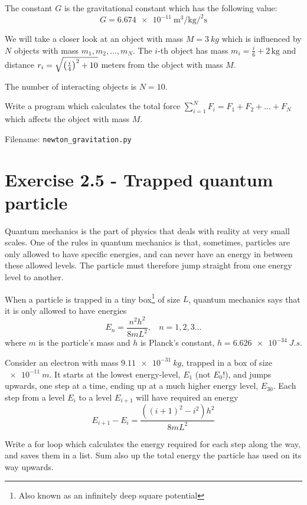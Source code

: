 \documentclass[10pt,a4paper]{article}
\newcommand{\planck}{$h = \SI{6.626e-34}{J.s}$}
\begin{document}
	The constant $G$ is the gravitational constant which has the following value:
	\[
	G = \SI{6.674e-11}{\cubic\meter\per\kilogram\per\squared\second}
	\]
	
	We will take a closer look at an object with mass $M = \SI{3}{kg}$ which is influenced by $N$ objects with mass  $m_1,m_2,\dots,m_N$. The $i$-th object has mass $m_i = \frac{i}{6}+2\,\mathrm{kg}$ and distance  $r_i = \sqrt{\qty(\frac{i}{4})^2 + 10}$ meters from the object with mass $M$. 
	
	The number of interacting objects is $N = 10$.
	
	Write a program which calculates the total force  $\sum_{i = 1}^N F_i = F_1 + F_2 + ... + F_N$ which affects the object with mass $M$. 
	
	Filename: \texttt{newton\_gravitation.py}

	



\section*{Exercise 2.5 - Trapped quantum particle}
Quantum mechanics is the part of physics that deals with reality at very small scales. One of the rules in quantum mechanics is that, sometimes, particles are only allowed to have specific energies, and can never have an energy in between these allowed levels. The particle must therefore jump straight from one energy level to another.

When a particle is trapped in a tiny box\footnote{Also known as an infinitely deep square potential} of size $L$, quantum mechanics says that it is only allowed to have energies 
\[	E_n = \frac{n^2h^2}{8mL^2}, \ \ \ \ n = 1,2,3\dots
\]
where $m$ is the particle's mass and $h$ is Planck's constant, \planck.

Consider an electron with mass $\SI{9.11e-31}{kg}$, trapped in a box of size $\SI{e-11}{m}$. It starts at the lowest energy-level, $E_1$ (not $E_0$!), and jumps upwards, one step at a time, ending up at a much higher energy level, $E_{30}$. Each step from a level $E_i$ to a level $E_{i+1}$ will have required an energy
\[  E_{i+1} - E_{i} = \frac{((i+1)^2-i^2)h^2}{8mL^2}
\]

Write a for loop which calculates the energy required for each step along the way, and saves them in a list. Sum also up the total energy the particle has used on its way upwards.
\end{document}
